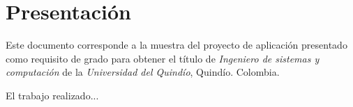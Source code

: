 \part{Presentación}

Este documento corresponde a la muestra del proyecto de aplicación presentado como requisito de grado para obtener el título de \textit{Ingeniero de sistemas y computación} de la \textit{Universidad del Quindío}, Quindío. Colombia.\par

El trabajo realizado...\par

\newpage
